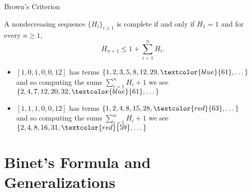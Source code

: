 \documentclass{beamer}
\begin{document}
\begin{frame}{
    Brown's Criterion}
    \begin{theorem}[Brown]
    A nondecreasing sequence $\{H_i\}_{i \ge 1}$ is complete if and only if $H_1 = 1$ and for every $n \ge 1$,\vspace{-0.1in}
        \[
            H_{n + 1} \leq 1 + \sum_{i = 1}^{n} H_i.
        \]
    \end{theorem}
	\begin{itemize}
\pause
\item $[1,0,1,0,0,12]$ has terms $\{1,2,3,5,8,12,29,\textcolor{blue}{61},\dots \}$\\
         and so computing the sums $\sum_{i=1}^{n}H_i +1$ we see $\{2,4,7,12,20,32,\textcolor{blue}{61},\dots \}$\\
\pause
\item $[1,1,1,0,0,12]$ has terms $\{1, 2, 4, 8, 15, 28,\textcolor{red}{63},\dots \}$\\
         and so computing the sums $\sum_{i=1}^{n}H_i +1$ we see $\{2,4,8,16,31,\textcolor{red}{59},\dots \}$
	\end{itemize}
\end{frame}

\section{Binet's Formula and Generalizations}
\end{document}
